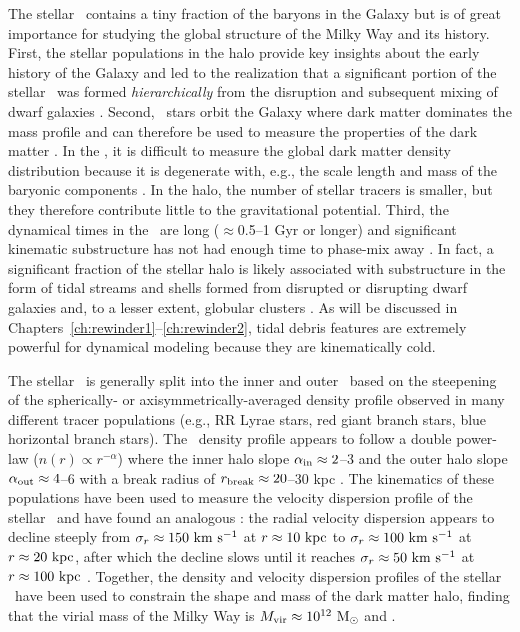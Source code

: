 The stellar \mwhalo\ contains a tiny fraction of the baryons in the Galaxy
\citep[$\approx$1\%;][]{bell08} but is of great importance for studying the
global structure of the Milky Way and its history. First, the stellar
populations in the halo provide key insights about the early history of the
Galaxy and led to the realization that a significant portion of the stellar
\mwhalo\ was formed \emph{hierarchically} from the disruption and subsequent
mixing of dwarf galaxies \citep[e.g.,][]{searle78, bullock05, bell08}. Second,
\mwhalo\ stars orbit the Galaxy where dark matter dominates the mass profile and
can therefore be used to measure the properties of the dark matter \mwhalo. In
the \mwdisk, it is difficult to measure the global dark matter density
distribution because it is degenerate with, e.g., the scale length and mass of
the baryonic components \citep{oort32,holmberg04,dehnen98a,sofue09}. In the
halo, the number of stellar tracers is smaller, but they therefore contribute
little to the gravitational potential. Third, the dynamical times in the
\mwhalo\ are long ($\approx$0.5--1 Gyr or longer) and significant kinematic
substructure has not had enough time to phase-mix away \citep{helmi99}. In fact,
a significant fraction \citep[$\approx$40--50\%;][]{bell08} of the stellar halo
is likely associated with substructure in the form of tidal streams and shells
formed from disrupted or disrupting dwarf galaxies and, to a lesser extent,
globular clusters \citep[e.g.,][]{newberg02,majewski03,belokurov06}. As will be
discussed in  Chapters~\ref{ch:rewinder1}--\ref{ch:rewinder2}, tidal debris
features are extremely powerful for dynamical modeling because they are
kinematically cold.

The stellar \mwhalo\ is generally split into the inner and outer \mwhalo\ based
on the steepening of the spherically- or axisymmetrically-averaged density
profile observed in many different tracer populations (e.g., RR Lyrae stars, red
giant branch stars, blue horizontal branch stars). The \mwhalo\ density profile
appears to follow a double power-law ($n(r) \propto r^{-\alpha}$) where the
inner halo slope $\alpha_{\rm in} \approx 2$--3 and the outer halo slope
$\alpha_{\rm out} \approx 4$--6 with a break radius of $r_{\rm break} \approx
20$--30 kpc \citep{watkins09, sesar10, deason11, sesar11, sesar13a}. The
kinematics of these populations have been used to measure the velocity
dispersion profile of the stellar \mwhalo\ and have found an analogous
\todo{[...]}: the radial velocity dispersion appears to decline steeply from
$\sigma_r \approx 150~\mathrm{km}~\mathrm{s}^{-1}$ at $r\approx10~\mathrm{kpc}$ to $\sigma_r \approx 100~\mathrm{km}~\mathrm{s}^{-1}$
at $r\approx20~\mathrm{kpc}$, after which the decline slows until it reaches $\sigma_r
\approx 50~\mathrm{km}~\mathrm{s}^{-1}$ at $r\approx100~\mathrm{kpc}$ \citep{battaglia05, xue08, brown10,
deason12b, deason13}. Together, the density and velocity dispersion profiles of
the stellar \mwhalo\ have been used to constrain the shape and mass of the dark
matter halo, finding that the virial mass of the Milky Way is $M_{\rm vir}
\approx 10^{12}~\mathrm{M}_\odot$ and .

